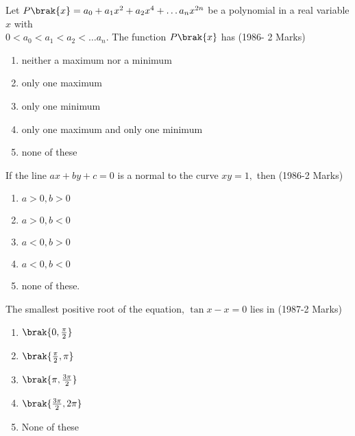 \iffalse
 \title{16.Applications of Derivatives}
 \author{EE24btech11058-P.Shiny Diavajna}
 \section{mcq-multiple} 
\fi

    
       \item 
	     Let $P\brak{x} = a_0+ a_1x^2+a_2x^4+\dots a_nx^{2n}$ be a polynomial in a real variable $x$ with \\
		 $0<a_0<a_1<a_2<\dots a_n. $ The function $P\brak{x}$ has 
	 \hfill(1986- 2 Marks)
      \begin{enumerate}

         \item neither a maximum nor a minimum
 
         \item only one maximum

         \item only one minimum

         \item only one maximum and only one minimum
   
         \item none of these\\

      \end{enumerate} 

      \item
       If the line $ax+by+c = 0$ is a normal to the curve $xy=1,$ then 
	 \hfill(1986-2 Marks)
        \begin{enumerate}
         \item $a>0,b>0$ 
         \item $a>0,b<0$ 
         \item $a<0,b>0$
         \item $a<0,b<0$
         \item none of these.
       \end{enumerate}

      \item 
      The smallest positive root of the equation, $\tan x-x=0$ lies in 
	\hfill(1987-2 Marks)
      \begin{enumerate}
       \item $\brak{0,\frac{\pi}{2}}$
       \item $\brak{\frac{\pi}{2},\pi}$
       \item $\brak{\pi,\frac{3\pi}{2}}$
       \item $\brak{\frac{3\pi}{2},2\pi}$
       \item None of these\\
      \end{enumerate}

